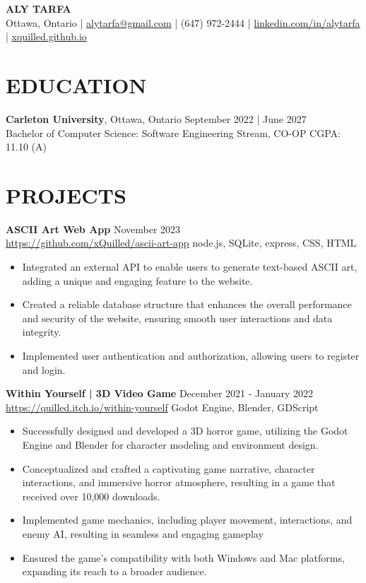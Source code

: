 \documentclass[a4paper,9pt]{extarticle}
\begin{document}
\pagestyle{empty}

\begin{center}
	\textbf{\Large ALY TARFA}\\[2pt]
	Ottawa, Ontario | \href{mailto:alytarfa@example.com}{alytarfa@gmail.com} | (647) 972-2444 | \href{https://www.linkedin.com/in/alytarfa}{linkedin.com/in/alytarfa} | \href{https://xquilled.github.io/}{xquilled.github.io}
\end{center}

\section*{EDUCATION}
\noindent
\textbf{Carleton University}, Ottawa, Ontario \hfill September 2022 | June 2027\\
Bachelor of Computer Science: Software Engineering Stream, CO-OP \hfill CGPA: 11.10 (A)

\section*{PROJECTS}
\noindent
\textbf{ASCII Art Web App} \hfill November 2023\\
\url{https://github.com/xQuilled/ascii-art-app} \hfill node.js, SQLite, express, CSS, HTML
\begin{itemize}
	\item Integrated an external API to enable users to generate text-based ASCII art, adding a unique and engaging feature to the website.
	\item Created a reliable database structure that enhances the overall performance and security of the website, ensuring smooth user interactions and data integrity.
	\item Implemented user authentication and authorization, allowing users to register and login.
\end{itemize}


\noindent
\textbf{Within Yourself | 3D Video Game} \hfill December 2021 - January 2022\\
\url{https://quilled.itch.io/within-yourself} \hfill Godot Engine, Blender, GDScript
\begin{itemize}
	\item Successfully designed and developed a 3D horror game, utilizing the Godot
	      Engine and Blender for character modeling and environment design.
	\item Conceptualized and crafted a captivating game narrative, character interactions,
	      and immersive horror atmosphere, resulting in a game that received over 10,000
	      downloads.
	\item Implemented game mechanics, including player movement, interactions, and
	      enemy AI, resulting in seamless and engaging gameplay
	\item Ensured the game's compatibility with both Windows and Mac platforms,
	      expanding its reach to a broader audience.
\end{itemize}
\end{document}

